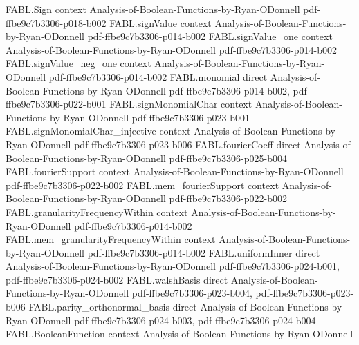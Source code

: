 \begin{theorem}
\label{FABL.coeff_krawtchoukGeneratingPolynomial}
\leanok
{}
\proofstep
  {FABL.Sign}
  {context}
  {Analysis-of-Boolean-Functions-by-Ryan-ODonnell}
  {pdf-ffbe9c7b3306-p018-b002}
\proofstep
  {FABL.signValue}
  {context}
  {Analysis-of-Boolean-Functions-by-Ryan-ODonnell}
  {pdf-ffbe9c7b3306-p014-b002}
\proofstep
  {FABL.signValue_one}
  {context}
  {Analysis-of-Boolean-Functions-by-Ryan-ODonnell}
  {pdf-ffbe9c7b3306-p014-b002}
\proofstep
  {FABL.signValue_neg_one}
  {context}
  {Analysis-of-Boolean-Functions-by-Ryan-ODonnell}
  {pdf-ffbe9c7b3306-p014-b002}
\proofstep
  {FABL.monomial}
  {direct}
  {Analysis-of-Boolean-Functions-by-Ryan-ODonnell}
  {pdf-ffbe9c7b3306-p014-b002,
    pdf-ffbe9c7b3306-p022-b001}
\proofstep
  {FABL.signMonomialChar}
  {context}
  {Analysis-of-Boolean-Functions-by-Ryan-ODonnell}
  {pdf-ffbe9c7b3306-p023-b001}
\proofstep
  {FABL.signMonomialChar_injective}
  {context}
  {Analysis-of-Boolean-Functions-by-Ryan-ODonnell}
  {pdf-ffbe9c7b3306-p023-b006}
\proofstep
  {FABL.fourierCoeff}
  {direct}
  {Analysis-of-Boolean-Functions-by-Ryan-ODonnell}
  {pdf-ffbe9c7b3306-p025-b004}
\proofstep
  {FABL.fourierSupport}
  {context}
  {Analysis-of-Boolean-Functions-by-Ryan-ODonnell}
  {pdf-ffbe9c7b3306-p022-b002}
\proofstep
  {FABL.mem_fourierSupport}
  {context}
  {Analysis-of-Boolean-Functions-by-Ryan-ODonnell}
  {pdf-ffbe9c7b3306-p022-b002}
\proofstep
  {FABL.granularityFrequencyWithin}
  {context}
  {Analysis-of-Boolean-Functions-by-Ryan-ODonnell}
  {pdf-ffbe9c7b3306-p014-b002}
\proofstep
  {FABL.mem_granularityFrequencyWithin}
  {context}
  {Analysis-of-Boolean-Functions-by-Ryan-ODonnell}
  {pdf-ffbe9c7b3306-p014-b002}
\proofstep
  {FABL.uniformInner}
  {direct}
  {Analysis-of-Boolean-Functions-by-Ryan-ODonnell}
  {pdf-ffbe9c7b3306-p024-b001,
    pdf-ffbe9c7b3306-p024-b002}
\proofstep
  {FABL.walshBasis}
  {direct}
  {Analysis-of-Boolean-Functions-by-Ryan-ODonnell}
  {pdf-ffbe9c7b3306-p023-b004,
    pdf-ffbe9c7b3306-p023-b006}
\proofstep
  {FABL.parity_orthonormal_basis}
  {direct}
  {Analysis-of-Boolean-Functions-by-Ryan-ODonnell}
  {pdf-ffbe9c7b3306-p024-b003,
    pdf-ffbe9c7b3306-p024-b004}
\proofstep
  {FABL.BooleanFunction}
  {context}
  {Analysis-of-Boolean-Functions-by-Ryan-ODonnell}

\end{theorem}
